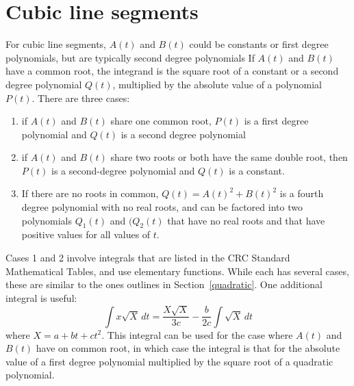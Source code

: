 \documentclass[12pt]{article}
\begin{document}
\section{Cubic line segments}\label{cubic}

For cubic line segments, $A(t)$ and $B(t)$ could be constants or
first degree polynomials, but are typically second degree
polynomials If $A(t)$ and $B(t)$ have a common root, the
integrand is the square root of a constant or a second degree
polynomial $Q(t)$, multiplied by the absolute value of a polynomial
$P(t)$. There are three cases:
\begin{enumerate}
  \item if $A(t)$ and $B(t)$ share one common root, $P(t)$ is a first
	degree polynomial and $Q(t)$ is a second degree polynomial
  \item if $A(t)$ and $B(t)$ share two roots or both have the same
	double root, then $P(t)$ is a second-degree polynomial and
	$Q(t)$ is a constant.
  \item If there are no roots in common, $Q(t) = A(t)^2 + B(t)^2$ is a
	fourth degree polynomial with no real roots, and can be
	factored into two polynomials $Q_1(t)$ and $(Q_2(t)$ that
	have no real roots and that have positive values for all values
	of $t$.
\end{enumerate}

Cases 1 and 2 involve integrals that are listed in the CRC Standard
Mathematical Tables, and use elementary functions. While each has
several cases, these are similar to the ones outlines in
Section~\ref{quadratic}.  One additional integral is useful:
      \[ \int x\sqrt{X}\,dt = \frac{X\sqrt{X}}{3c}
        - \frac{b}{2c}\int\sqrt{X}\,dt \]
where $X = a + bt + ct^2$. This integral can be used for the case
where $A(t)$ and $B(t)$ have on common root, in which case the
integral is that for the absolute value of a first degree polynomial
multiplied by the square root of a quadratic polynomial.
\end{document}
